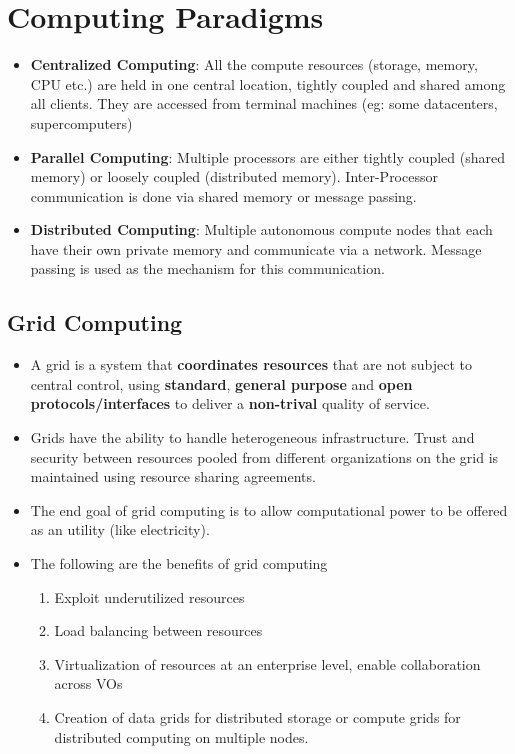 \documentclass{article}
\begin{document}
\section{Computing Paradigms}
\begin{itemize}
    \item \textbf{Centralized Computing}: All the compute resources (storage, memory, CPU etc.) are held in one central location, tightly coupled and shared among all clients. They are accessed from terminal machines (eg: some datacenters, supercomputers)
    
    \item \textbf{Parallel Computing}: Multiple processors are either tightly coupled (shared memory) or loosely coupled (distributed memory). Inter-Processor communication is done via shared memory or message passing. 
    
    \item\textbf{Distributed Computing}: Multiple autonomous compute nodes that each have their own private memory and communicate via a network. Message passing is used as the mechanism for this communication. 
\end{itemize}

\subsection{Grid Computing}
\begin{itemize}
    \item A grid is a system that \textbf{coordinates resources} that are not subject to central control, using \textbf{standard}, \textbf{general purpose} and \textbf{open protocols/interfaces }to deliver a \textbf{non-trival} quality of service. 
    
    \item Grids have the ability to handle heterogeneous infrastructure. Trust and security between resources pooled from different organizations on the grid is maintained using resource sharing agreements. 
    
    \item The end goal of grid computing is to allow computational power to be offered as an utility (like electricity). 
    
    \item The following are the benefits of grid computing
    \begin{enumerate}
        \item Exploit underutilized resources
        
        \item Load balancing between resources
        
        \item Virtualization of resources at an enterprise level, enable collaboration across VOs
        
        \item Creation of data grids for distributed storage or compute grids for distributed computing on multiple nodes. 
    \end{enumerate}
\end{itemize}
\end{document}

